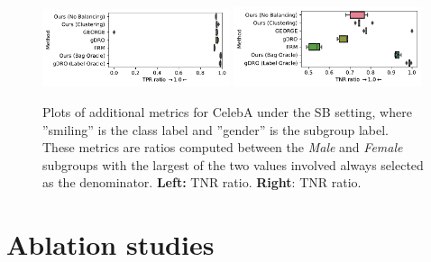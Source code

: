 \begin{figure}[t]
 \includegraphics[width=0.49\textwidth]{supmatch/figures/celeba/no_unsmiling_males/celeba_gender_smiling_tprr.pdf}
 \includegraphics[width=0.49\textwidth]{supmatch/figures/celeba/no_unsmiling_males/celeba_gender_smiling_tnrr.pdf}
 \caption{%
   Plots of additional metrics for CelebA under the SB setting, where ''smiling'' is the class
 label and ''gender'' is the subgroup label. These metrics are ratios computed between the
\emph{Male} and \emph{Female} subgroups with the largest of the two values involved always selected
as the denominator. \textbf{Left:} TNR ratio. \textbf{Right}: TNR ratio. }%
 \label{fig:celeba-gender-smiling-add}
\end{figure}

\section{Ablation studies}\label{sec:ablations}
